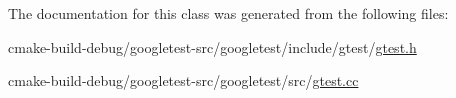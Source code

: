 The documentation for this class was generated from the following files\+:\begin{DoxyCompactItemize}
\item 
cmake-\/build-\/debug/googletest-\/src/googletest/include/gtest/\mbox{\hyperlink{gtest_8h}{gtest.\+h}}\item 
cmake-\/build-\/debug/googletest-\/src/googletest/src/\mbox{\hyperlink{gtest_8cc}{gtest.\+cc}}\end{DoxyCompactItemize}
